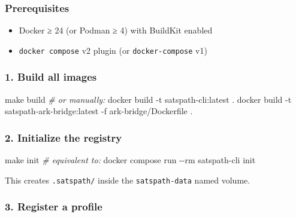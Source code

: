 \documentclass[
]{article}
\newenvironment{Shaded}{}{}
\newcommand{\AttributeTok}[1]{\textcolor[rgb]{0.49,0.56,0.16}{#1}}
\newcommand{\CommentTok}[1]{\textcolor[rgb]{0.38,0.63,0.69}{\textit{#1}}}
\newcommand{\ExtensionTok}[1]{#1}
\newcommand{\FunctionTok}[1]{\textcolor[rgb]{0.02,0.16,0.49}{#1}}
\newcommand{\NormalTok}[1]{#1}
\providecommand{\tightlist}{%
  \setlength{\itemsep}{0pt}\setlength{\parskip}{0pt}}
\begin{document}
\hypertarget{prerequisites}{%
\subsubsection{Prerequisites}\label{prerequisites}}

\begin{itemize}
\tightlist
\item
  Docker ≥ 24 (or Podman ≥ 4) with BuildKit enabled
\item
  \texttt{docker\ compose} v2 plugin (or \texttt{docker-compose} v1)
\end{itemize}

\hypertarget{build-all-images}{%
\subsubsection{1. Build all images}\label{build-all-images}}

\begin{Shaded}
\begin{Highlighting}[]
\FunctionTok{make}\NormalTok{ build}
\CommentTok{\# or manually:}
\ExtensionTok{docker}\NormalTok{ build }\AttributeTok{{-}t}\NormalTok{ satspath{-}cli:latest .}
\ExtensionTok{docker}\NormalTok{ build }\AttributeTok{{-}t}\NormalTok{ satspath{-}ark{-}bridge:latest }\AttributeTok{{-}f}\NormalTok{ ark{-}bridge/Dockerfile .}
\end{Highlighting}
\end{Shaded}

\hypertarget{initialize-the-registry}{%
\subsubsection{2. Initialize the
registry}\label{initialize-the-registry}}

\begin{Shaded}
\begin{Highlighting}[]
\FunctionTok{make}\NormalTok{ init}
\CommentTok{\# equivalent to:}
\ExtensionTok{docker}\NormalTok{ compose run }\AttributeTok{{-}{-}rm}\NormalTok{ satspath{-}cli init}
\end{Highlighting}
\end{Shaded}

This creates \texttt{.satspath/} inside the \texttt{satspath-data} named
volume.

\hypertarget{register-a-profile}{%
\subsubsection{3. Register a profile}\label{register-a-profile}}
\end{document}
